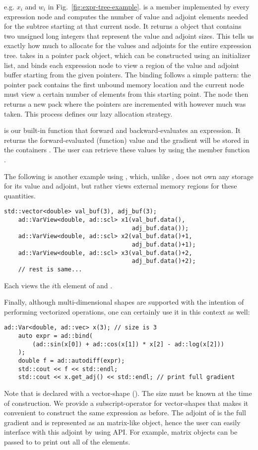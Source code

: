 e.g. $x_i$ and $w_i$ in Fig.~\ref{fig:expr-tree-example}.
 is a member implemented by every expression node
and computes the number of value and adjoint elements
needed for the subtree starting at that current node.
It returns a  object that contains two unsigned long integers
that represent the value and adjoint sizes.
This tells us exactly how much to allocate for the values and adjoints 
for the entire expression tree.
 takes in a pointer pack object,
which can be constructed using an initializer list,
and binds each expression node to view 
a region of the value and adjoint buffer starting from the given pointers.
The binding follows a simple pattern:
the pointer pack contains the first unbound memory location and 
the current node must view a certain number of elements from this starting point.
The node then returns a new pack where the pointers are incremented with however much was taken.
This process defines our lazy allocation strategy.

 is our built-in function that forward and backward-evaluates an expression.
It returns the forward-evaluated (function) value
and the gradient will be stored in the containers .
The user can retrieve these values by using the member function .

The following is another example using ,
which, unlike , does not own any storage for its value and adjoint,
but rather views external memory regions for these quantities.
\begin{lstlisting}[style=customcpp]
    std::vector<double> val_buf(3), adj_buf(3);
    ad::VarView<double, ad::scl> x1(val_buf.data(), 
                                    adj_buf.data());
    ad::VarView<double, ad::scl> x2(val_buf.data()+1, 
                                    adj_buf.data()+1);
    ad::VarView<double, ad::scl> x3(val_buf.data()+2, 
                                    adj_buf.data()+2);
    // rest is same...
\end{lstlisting}
Each  views the $i$th element of  and .

Finally, although multi-dimensional shapes are supported with the intention of
performing vectorized operations, one can certainly use it in this context as well:
\begin{lstlisting}[style=customcpp]
    ad::Var<double, ad::vec> x(3); // size is 3
    auto expr = ad::bind(
        (ad::sin(x[0]) + ad::cos(x[1]) * x[2] - ad::log(x[2]))
    );
    double f = ad::autodiff(expr);
    std::cout << f << std::endl;
    std::cout << x.get_adj() << std::endl; // print full gradient
\end{lstlisting}
Note that  is declared with a vector-shape ().
The size must be known at the time of construction.
We provide a subscript-operator for vector-shapes
that makes it convenient to construct the same expression as before.
The adjoint of  is the full gradient and 
is represented as an  matrix-like object,
hence the user can easily interface with this adjoint by using  API.\@
For example,  matrix objects can be passed to 
to print out all of the elements.
